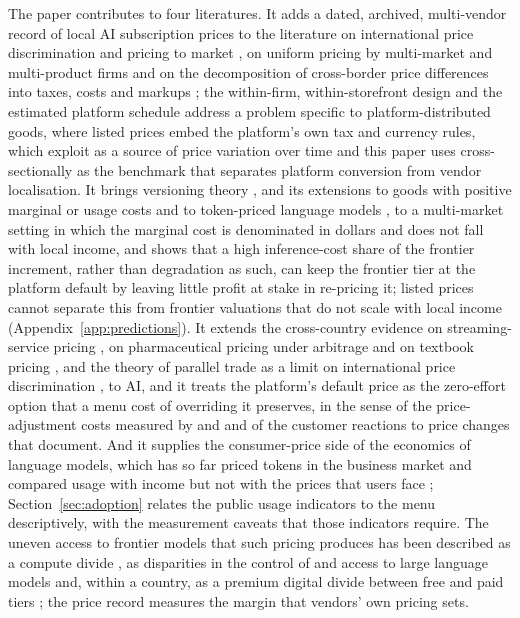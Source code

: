 \documentclass[11pt]{article}
\theoremstyle{definition}
\theoremstyle{remark}
\begin{document}
The paper contributes to four literatures. It adds a dated, archived, multi-vendor record of local AI subscription prices to the literature on international price discrimination and pricing to market \citep{krugman1986pricing,goldberg1997goods,atkeson2008pricing,cavallo2014currency}, on uniform pricing by multi-market and multi-product firms \citep{dellavigna2019uniform,shiller2011music} and on the decomposition of cross-border price differences into taxes, costs and markups \citep{goldberg2001evolution,gopinath2011international}; the within-firm, within-storefront design and the estimated platform schedule address a problem specific to platform-distributed goods, where listed prices embed the platform's own tax and currency rules, which \citet{enache2023demand} exploit as a source of price variation over time and this paper uses cross-sectionally as the benchmark that separates platform conversion from vendor localisation. It brings versioning theory \citep{mussa1978monopoly,deneckere1996damaged,bhargava2001information,bhargava2008versioning,sundararajan2004nonlinear}, and its extensions to goods with positive marginal or usage costs \citep{jones2011information,chellappa2018cost} and to token-priced language models \citep{bergemann2025menu}, to a multi-market setting in which the marginal cost is denominated in dollars and does not fall with local income, and shows that a high inference-cost share of the frontier increment, rather than degradation as such, can keep the frontier tier at the platform default by leaving little profit at stake in re-pricing it; listed prices cannot separate this from frontier valuations that do not scale with local income (Appendix~\ref{app:predictions}). It extends the cross-country evidence on streaming-service pricing \citep{waldfogel2020spotify}, on pharmaceutical pricing under arbitrage \citep{danzon2000crossnational} and on textbook pricing \citep{cabolis2007textbook}, and the theory of parallel trade as a limit on international price discrimination \citep{malueg1994parallel,valletti2006differential}, to AI, and it treats the platform's default price as the zero-effort option that a menu cost of overriding it preserves, in the sense of the price-adjustment costs measured by \citet{levy1997magnitude} and \citet{zbaracki2004managerial} and of the customer reactions to price changes that \citet{anderson2010price} document. And it supplies the consumer-price side of the economics of language models, which has so far priced tokens in the business market \citep{demirer2026emerging,demirer2025emerging} and compared usage with income but not with the prices that users face \citep{liu2025who,misra2025measuring,chatterji2025how,appel2025uneven,daepp2026how,iscenko2026atlas}; Section~\ref{sec:adoption} relates the public usage indicators to the menu descriptively, with the measurement caveats that those indicators require. The uneven access to frontier models that such pricing produces has been described as a compute divide \citep{lehdonvirta2024compute}, as disparities in the control of and access to large language models \citep{sathish2024llempower} and, within a country, as a premium digital divide between free and paid tiers \citep{kanzamanova2026digital}; the price record measures the margin that vendors' own pricing sets.
\end{document}
